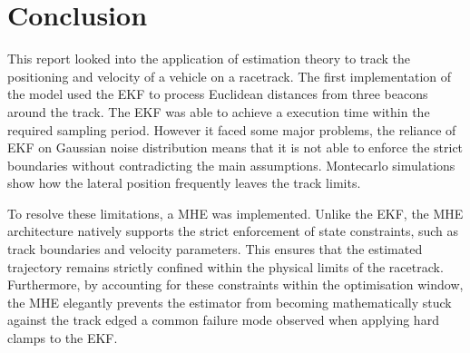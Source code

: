\section{Conclusion}
\label{sec:conclusion}
This report looked into the application of estimation theory to track the positioning and velocity of a vehicle on a racetrack. The first implementation of the model used the EKF to process Euclidean distances from three beacons around the track. The EKF was able to achieve a execution time within the required sampling period. However it faced some major problems, the reliance of EKF on Gaussian noise distribution means that it is not able to enforce the strict boundaries without contradicting the main assumptions. Montecarlo simulations show how the lateral position frequently leaves the track limits.

To resolve these limitations, a MHE was implemented. Unlike the EKF, the MHE architecture natively supports the strict enforcement of state constraints, such as track boundaries and velocity parameters. This ensures that the estimated trajectory remains strictly confined within the physical limits of the racetrack. Furthermore, by accounting for these constraints within the optimisation window, the MHE elegantly prevents the estimator from becoming mathematically stuck against the track edged a common failure mode observed when applying hard clamps to the EKF.